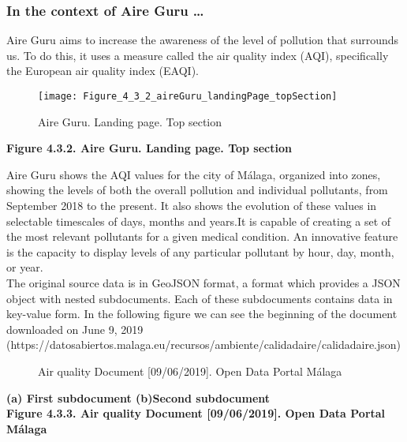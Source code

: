 \subsubsection*{In the context of Aire Guru \ldots} 

Aire Guru aims to increase the awareness of the level of pollution that surrounds us.
To do this, it uses a measure called the air quality index (AQI), specifically the European air quality index (EAQI).

\begin{figure}[ht]
    \centering
    \texttt{[image: Figure\_4\_3\_2\_aireGuru\_landingPage\_topSection]}
    \caption{Aire Guru. Landing page. Top section}
\end{figure}
\begin{center}
    \bf{        
    Figure 4.3.2. Aire Guru. Landing page. Top section}
\end{center}

Aire Guru shows the AQI values for the city of Málaga, organized into zones, showing the levels of both the overall pollution and individual pollutants, from September 2018 to the present.
It also shows the evolution of these values in selectable timescales of days, months and years.It is capable of creating a set of the most relevant pollutants for a given medical condition.
An innovative feature is the capacity to display levels of any particular pollutant by hour, day, month, or year. \\

The original source data is in GeoJSON format, a format which provides a JSON object with nested subdocuments.
Each of these subdocuments contains data in key-value form.
In the following figure we can see the beginning of the document downloaded on June 9, 2019 (https://datosabiertos.malaga.eu/recursos/ambiente/calidadaire/calidadaire.json) \\

\begin{figure}[ht]
    \centering
    \hfill
    \caption{Air quality Document [09/06/2019]. Open Data Portal Málaga}
\end{figure}
    
\begin{center}
    \bf{        (a) First subdocument (b)Second subdocument \\
    Figure 4.3.3. Air quality Document [09/06/2019]. Open Data Portal Málaga}
\end{center}

